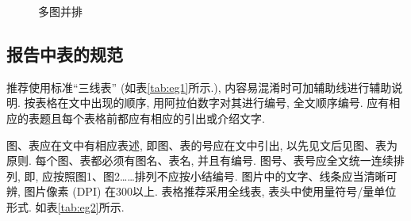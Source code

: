 \documentclass{urtemp}
\begin{document}
\begin{figure}[H]
  \centering
  \label{fig:2.1}    
  \label{fig:2.2}
        
  \caption{多图并排}\label{fig:2}
\end{figure}

\subsection{报告中表的规范}
推荐使用标准“三线表” (如表\ref{tab:eg1}所示.), 内容易混淆时可加辅助线进行辅助说明. 按表格在文中出现的顺序, 用阿拉伯数字对其进行编号, 全文顺序编号. 应有相应的表题且每个表格前都应有相应的引出或介绍文字. 

图、表应在文中有相应表述, 即图、表的号应在文中引出, 以先见文后见图、表为原则. 每个图、表都必须有图名、表名, 并且有编号. 图号、表号应全文统一连续排列, 即, 应按照图1、图2……排列不应按小结编号. 图片中的文字、线条应当清晰可辨, 图片像素 (DPI) 在300以上. 
表格推荐采用全线表, 表头中使用量符号/量单位形式. 如表\ref{tab:eg2}所示. 
\end{document}
